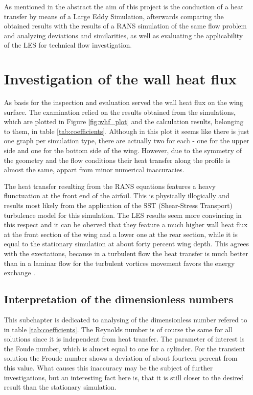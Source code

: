 As mentioned in the abstract the aim of this project is the conduction of a heat transfer by means of a Large Eddy Simulation, afterwards comparing the obtained results with the results of a RANS simulation of the same flow problem and analyzing deviations and similarities, as well as evaluating the applicability of the LES for technical flow investigation.

\section{Investigation of the wall heat flux}
As basis for the inspection and evaluation served the wall heat flux on the wing surface. The examination relied on the results obtained from the simulations, which are plotted in Figure \ref{fig:whf_plot} and the calculation results, belonging to them, in table \ref{tab:coefficients}. Although in this plot it seems like there is just one graph per simulation type, there are actually two for each - one for the upper side and one for the bottom side of the wing. However, due to the symmetry of the geometry and the flow conditions their heat transfer along the profile is almost the same, appart from minor numerical inaccuracies.
	
The heat transfer resulting from the RANS equations features a heavy flunctuation at the front end of the airfoil. This is physically illogically and results most likely from the application of the SST (Shear-Stress Transport) turbulence model for this simulation. The LES results seem more convincing in this respect and it can be oberved that they feature a much higher wall heat flux at the front section of the wing and a lower one at the rear section, while it is equal to the stationary simulation at about forty percent wing depth. This agrees with the exectations, because in a turbulent flow the heat transfer is much better than in a laminar flow for the turbulent vortices movement favors the energy exchange \cite{versteeg}.
\subsection{Interpretation of the dimensionless numbers}
This subchapter is dedicated to analysing of the dimensionless number refered to in table \ref{tab:coefficients}. The Reynolds number is of course the same for all solutions since it is independent from heat transfer.
The parameter of interest is the Foude number, which is almost equal to one for a cylinder. For the transient solution the Froude number shows a deviation of about fourteen percent from this value. What causes this inaccuracy may be the subject of further investigations, but an interesting fact here is, that it is still closer to the desired result than the stationary simulation.
